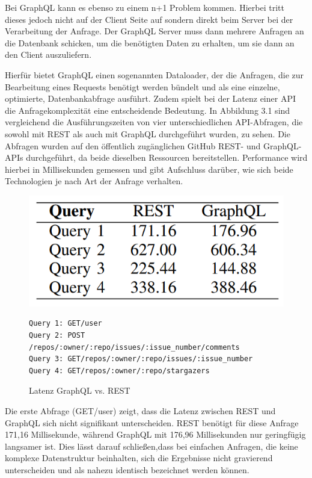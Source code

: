\noindent
Bei GraphQL kann es ebenso zu einem n+1 Problem kommen. Hierbei tritt dieses jedoch nicht auf der Client Seite auf sondern direkt beim Server bei der Verarbeitung der Anfrage. Der GraphQL Server muss dann mehrere Anfragen an die Datenbank schicken, um die benötigten Daten zu erhalten, um sie dann an den Client auszuliefern.
\citep{graphqlsemantics}

\noindent
Hierfür bietet GraphQL einen sogenannten Dataloader, der die Anfragen, die zur Bearbeitung eines Requests benötigt werden bündelt und als eine einzelne, optimierte, Datenbankabfrage ausführt. \citep{nordstrom2022graphql}
\newline
\noindent
Zudem spielt bei der Latenz einer API die Anfragekomplexität eine entscheidende Bedeutung. In Abbildung 3.1 sind vergleichend die Ausführungszeiten von vier unterschiedlichen API-Abfragen, die sowohl mit REST als auch mit GraphQL durchgeführt wurden, zu sehen. Die Abfragen wurden auf den öffentlich zugänglichen GitHub REST- und GraphQL-APIs durchgeführt, da beide dieselben Ressourcen bereitstellen. Performance wird hierbei in Millisekunden gemessen und gibt Aufschluss darüber, wie sich beide Technologien je nach Art der Anfrage verhalten. 
\begin{figure}[H]
	\centering
	\includegraphics[scale=.5]{Illustrations/cangraphqlreplacerest.png}
\begin{BVerbatim}
Query 1: GET/user
Query 2: POST /repos/:owner/:repo/issues/:issue_number/comments
Query 3: GET/repos/:owner/:repo/issues/:issue_number
Query 4: GET/repos/:owner/:repo/stargazers
\end{BVerbatim}
	\caption{Latenz GraphQL vs. REST \citep{graphqlreplacerest}}
\end{figure}
\noindent
Die erste Abfrage (GET/user) zeigt, dass die Latenz zwischen REST und GraphQL sich nicht signifikant unterscheiden. REST benötigt für diese Anfrage 171,16 Millisekunde, während GraphQL mit 176,96 Millisekunden nur geringfügig langsamer ist. Dies lässt darauf schließen,dass bei einfachen Anfragen, die keine komplexe Datenstruktur beinhalten, sich die Ergebnisse nicht gravierend unterscheiden und als nahezu identisch bezeichnet werden können.

